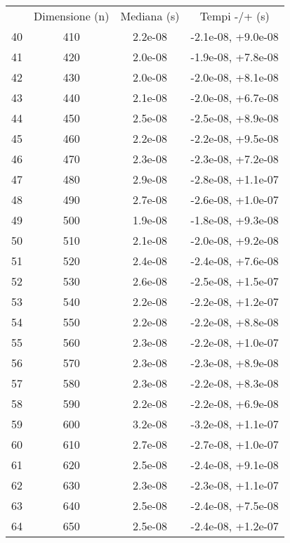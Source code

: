 \begin{table}
\centering
\begin{adjustbox}{width=1\textwidth/2}
\begin{tabular}{|c|c|c|c|}
\hline
 & Dimensione (n) & Mediana (s) & Tempi -/+ (s) \\
40 & 410 & 2.2e-08 & -2.1e-08, +9.0e-08 \\
\cline{1-4}
41 & 420 & 2.0e-08 & -1.9e-08, +7.8e-08 \\
\cline{1-4}
42 & 430 & 2.0e-08 & -2.0e-08, +8.1e-08 \\
\cline{1-4}
43 & 440 & 2.1e-08 & -2.0e-08, +6.7e-08 \\
\cline{1-4}
44 & 450 & 2.5e-08 & -2.5e-08, +8.9e-08 \\
\cline{1-4}
45 & 460 & 2.2e-08 & -2.2e-08, +9.5e-08 \\
\cline{1-4}
46 & 470 & 2.3e-08 & -2.3e-08, +7.2e-08 \\
\cline{1-4}
47 & 480 & 2.9e-08 & -2.8e-08, +1.1e-07 \\
\cline{1-4}
48 & 490 & 2.7e-08 & -2.6e-08, +1.0e-07 \\
\cline{1-4}
49 & 500 & 1.9e-08 & -1.8e-08, +9.3e-08 \\
\cline{1-4}
50 & 510 & 2.1e-08 & -2.0e-08, +9.2e-08 \\
\cline{1-4}
51 & 520 & 2.4e-08 & -2.4e-08, +7.6e-08 \\
\cline{1-4}
52 & 530 & 2.6e-08 & -2.5e-08, +1.5e-07 \\
\cline{1-4}
53 & 540 & 2.2e-08 & -2.2e-08, +1.2e-07 \\
\cline{1-4}
54 & 550 & 2.2e-08 & -2.2e-08, +8.8e-08 \\
\cline{1-4}
55 & 560 & 2.3e-08 & -2.2e-08, +1.0e-07 \\
\cline{1-4}
56 & 570 & 2.3e-08 & -2.3e-08, +8.9e-08 \\
\cline{1-4}
57 & 580 & 2.3e-08 & -2.2e-08, +8.3e-08 \\
\cline{1-4}
58 & 590 & 2.2e-08 & -2.2e-08, +6.9e-08 \\
\cline{1-4}
59 & 600 & 3.2e-08 & -3.2e-08, +1.1e-07 \\
\cline{1-4}
60 & 610 & 2.7e-08 & -2.7e-08, +1.0e-07 \\
\cline{1-4}
61 & 620 & 2.5e-08 & -2.4e-08, +9.1e-08 \\
\cline{1-4}
62 & 630 & 2.3e-08 & -2.3e-08, +1.1e-07 \\
\cline{1-4}
63 & 640 & 2.5e-08 & -2.4e-08, +7.5e-08 \\
\cline{1-4}
64 & 650 & 2.5e-08 & -2.4e-08, +1.2e-07 \\

\end{tabular}
\end{adjustbox}
\end{table}
